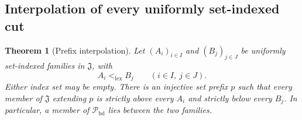 \documentclass[11pt]{article}
\newtheorem{theorem}{Theorem}[section]
\theoremstyle{definition}
\theoremstyle{remark}
\newcommand{\Jinj}{\mathfrak J}
\newcommand{\Pbd}{\mathcal P_{\mathrm{bd}}}
\newcommand{\lex}{\mathrm{lex}}
\begin{document}
\subsection{Interpolation of every uniformly set-indexed cut}

\begin{theorem}[Prefix interpolation]\label{swo:gl:interpolation}
Let $(A_i)_{i\in I}$ and $(B_j)_{j\in J}$ be uniformly set-indexed families
in $\Jinj$, with
\[
 A_i<_{\lex}B_j\qquad(i\in I,\ j\in J).
\]
Either index set may be empty.  There is an injective set prefix $p$ such that
every member of $\Jinj$ extending $p$ is strictly above every $A_i$ and
strictly below every $B_j$.  In particular, a member of $\Pbd$ lies between
the two families.
\end{theorem}
\end{document}
